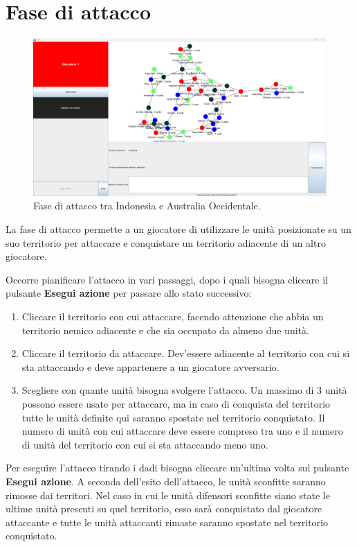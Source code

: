 \documentclass[a4paper,12pt]{report}
\begin{document}
\section{Fase di attacco}
\begin{figure}[H]
	\centering
	\includegraphics[width=1\textwidth]{user_guide/9_excecuting attack.png}
	\caption{Fase di attacco tra Indonesia e Australia Occidentale.}
\end{figure}
La fase di attacco permette a un giocatore di utilizzare le unità posizionate su un suo territorio per attaccare e conquistare un territorio adiacente di un altro giocatore.

Occorre pianificare l'attacco in vari passaggi, dopo i quali bisogna cliccare il pulsante \textbf{Esegui azione} per passare allo stato successivo:
\begin{enumerate}
	\item Cliccare il territorio con cui attaccare, facendo attenzione che abbia un territorio nemico adiacente e che sia occupato da almeno due unità.
	\item Cliccare il territorio da attaccare. Dev'essere adiacente al territorio con cui si sta attaccando e deve appartenere a un giocatore avversario.
	\item Scegliere con quante unità bisogna svolgere l'attacco. Un massimo di 3 unità possono essere usate per attaccare, ma in caso di conquista del territorio tutte le unità definite qui saranno spostate nel territorio conquistato. Il numero di unità con cui attaccare deve essere compreso tra uno e il numero di unità del territorio con cui si sta attaccando meno uno.
\end{enumerate}

Per eseguire l'attacco tirando i dadi bisogna cliccare un'ultima volta sul pulsante \textbf{Esegui azione}.
A seconda dell'esito dell'attacco, le unità sconfitte saranno rimosse dai territori.
Nel caso in cui le unità difensori sconfitte siano state le ultime unità presenti su quel territorio, esso sarà conquistato dal giocatore attaccante e tutte le unità attaccanti rimaste saranno spostate nel territorio conquistato.
\end{document}
